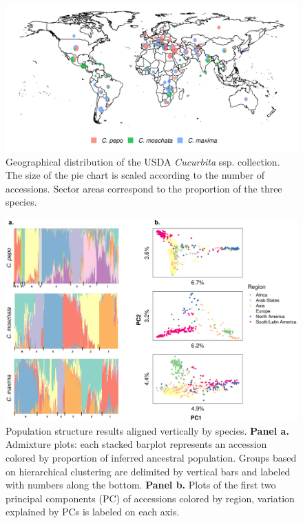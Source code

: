 \documentclass[utf8]{FrontiersinHarvard} %
\begin{document}
\begin{figure}[h]
	\begin{center}
		\includegraphics[width=\textwidth]{../final_figures/01_fig.png}
	\end{center}
	\caption{Geographical distribution of the USDA \textit{Cucurbita} ssp. collection. The size of the pie chart is scaled according to the number of accessions. Sector areas correspond to the proportion of the three species. \label{fig:1}}
\end{figure}

\clearpage


\begin{figure}[h]
	\begin{center}
		\includegraphics[width=\textwidth]{../final_figures/03_fig.png}
	\end{center}
	\caption{Population structure results aligned vertically by species. \textbf{Panel a.} Admixture plots: each stacked barplot represents an accession colored by proportion of inferred ancestral population. Groups based on hierarchical clustering are delimited by vertical bars and labeled with numbers along the bottom. \textbf{Panel b.} Plots of the first two principal components (PC) of accessions colored by region, variation explained by PCs is labeled on each axis. \label{fig:3}}
\end{figure}
\end{document}

